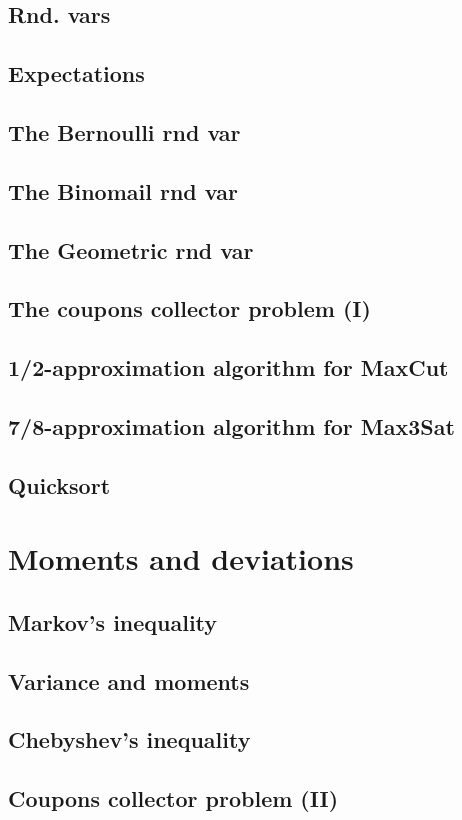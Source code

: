 \documentclass{book}
\begin{document}
\section{Rnd. vars}
\section{Expectations}
\section{The Bernoulli rnd var}
\section{The Binomail rnd var}
\section{The Geometric rnd var}
\section{The coupons collector problem (I)}
\section{1/2-approximation algorithm for MaxCut}
\section{7/8-approximation algorithm for Max3Sat}
\section{Quicksort}

\chapter{Moments and deviations}
\section{Markov's inequality}
\section{Variance and moments}
\section{Chebyshev's inequality}
\section{Coupons collector problem (II)}
\end{document}
